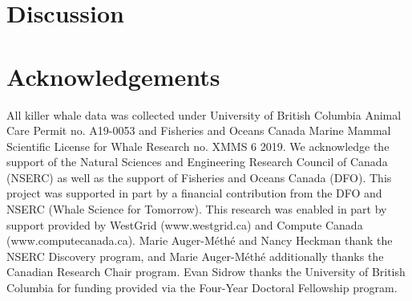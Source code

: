 \documentclass{article}
\begin{document}
\section{Discussion}


\section*{Acknowledgements}
All killer whale data was collected under University of British Columbia Animal Care Permit no. A19-0053 and Fisheries and Oceans Canada Marine Mammal Scientific License for Whale Research no. XMMS 6 2019.
We acknowledge the support of the Natural Sciences and Engineering Research Council of Canada (NSERC) as well as the support of Fisheries and Oceans Canada (DFO). This project was supported in part by a financial contribution from the DFO and NSERC (Whale Science for Tomorrow).
This research was enabled in part by support provided by WestGrid (www.westgrid.ca) and Compute Canada (www.computecanada.ca).
Marie Auger-M\'eth\'e and Nancy Heckman thank the NSERC Discovery program, and Marie Auger-M\'eth\'e additionally thanks the Canadian Research Chair program.
Evan Sidrow thanks the University of British Columbia for funding provided via the Four-Year Doctoral Fellowship program.

\newpage



\newpage
\begin{appendix}

\end{appendix}
\end{document}
